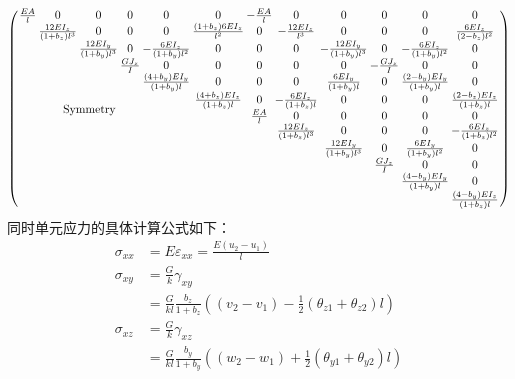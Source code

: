\documentclass[forprint]{WHUBachelor}
\begin{document}
\begin{equation}
\setlength{\arraycolsep}{1pt}
\left(\begin{array}{cccccccccccc}
  \frac{EA}{l} & 0 & 0 & 0 & 0 & 0 & -\frac{EA}{l} & 0 & 0 & 0 & 0 & 0\\
 & \frac{12EI_z}{(1+b_z)l^3} & 0 & 0 & 0 & \frac{(1+b_z)6EI_z}{l^2} & 0 & -\frac{12EI_z}{l^3} & 0 & 0 & 0 & \frac{6EI_z}{(2-b_z)l^2} \\
 &  & \frac{12EI_y}{(1+b_y)l^3} & 0 & -\frac{6EI_z}{(1+b_y)l^2} & 0 & 0 & 0 & -\frac{12EI_y}{(1+b_y)l^3} & 0 & -\frac{6EI_z}{(1+b_y)l^2} & 0 \\
 &  &  & \frac{GJ_z}{I} & 0 & 0 & 0 & 0 & 0 & - \frac{GJ_z}{I} & 0 & 0\\
 &  &  &  & \frac{(4+b_y)EI_y}{(1+b_y)l} & 0 & 0 & 0 & \frac{6EI_y}{(1+b_y)l} & 0 & \frac{(2-b_y)EI_y}{(1+b_y)l} & 0\\
 &  &  &  &  & \frac{(4+b_z)EI_z}{(1+b_z)l} & 0 & -\frac{6EI_z}{(1+b_z)l} & 0 & 0 & 0 & \frac{(2-b_z)EI_z}{(1+b_z)l}\\
 &  \multicolumn{3}{c}{\raisebox{1.3ex}[0pt]{Symmetry}}  &  &  &\frac{EA}{l} & 0 & 0 & 0 & 0 & 0\\
 &  &  &  &  &  &  & \frac{12EI_z}{(1+b_z)l^3} & 0 & 0 & 0 & -\frac{6EI_z}{(1+b_z)l^2}\\
 &  &  &  &  &  &  &  & \frac{12EI_y}{(1+b_y)l^3} & 0 & \frac{6EI_y}{(1+b_y)l^2} & 0\\
 &  &  &  &  &  &  &  &  & \frac{GJ_z}{I} & 0 & 0\\
 &  &  &  &  &  &  &  &  &  & \frac{(4-b_y)EI_y}{(1+b_y)l} & 0\\
 &  &  &  &  &  &  &  &  &  &  &\frac{(4-b_y)EI_z}{(1+b_z)l}\\
\end{array}\right)
\end{equation}
同时单元应力的具体计算公式如下：
\begin{equation} 
\begin{aligned} \sigma_{x x} &=E \varepsilon_{x x}=\frac{E\left(u_{2}-u_{1}\right)}{l} \\ \sigma_{x y} &=\frac{G}{k} \gamma_{x y} \\ &=\frac{G}{k l} \frac{b_{z}}{1+b_{z}}\left(\left(v_{2}-v_{1}\right)-\frac{1}{2}\left(\theta_{z 1}+\theta_{z 2}\right) l\right) \\ \sigma_{x z} &=\frac{G}{k} \gamma_{x z} \\ &=\frac{G}{k l} \frac{b_{y}}{1+b_{y}}\left(\left(w_{2}-w_{1}\right)+\frac{1}{2}\left(\theta_{y 1}+\theta_{y 2}\right) l\right) \end{aligned}
 \end{equation}
\end{document}
